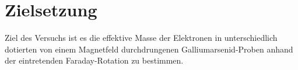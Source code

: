 
\section{Zielsetzung}
\label{sec:Zielsetzung}

Ziel des Versuchs ist es die effektive Masse der Elektronen in unterschiedlich dotierten von einem Magnetfeld durchdrungenen Galliumarsenid-Proben anhand der eintretenden Faraday-Rotation zu bestimmen.